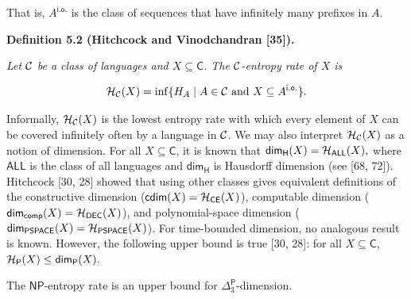 That is, $A^{\mathsf{i.o.}}$ is the class of sequences that have infinitely many
prefixes in $A$.\par





\par\medskip\noindent\textbf{
\textbf{Definition 5.2}\textbf{ }(Hitchcock and Vinodchandran [35])\textbf{.}
}\par



\emph{Let ${\cal C}$ be a class of languages and $X\subseteq\mathsf{C}$. The ${\cal C}$-entropy rate of $X$ is}\par


\[\begin{gathered}
{\cal H}_{\cal C}(X)=\inf\{H_{A}\mid A\in{\cal C}\textrm{ and }X\subseteq A^{\mathsf{i.o.}}\}.
\end{gathered}\]






Informally, ${\cal H}_{\cal C}(X)$ is the lowest entropy rate with which every
element of $X$ can be covered infinitely often by a language in
${\cal C}$.
We may also interpret ${\cal H}_{\cal C}(X)$ as a notion of dimension.
For all $X\subseteq\mathsf{C}$, it is known that
${\mathsf{dim}}_{\mathsf{H}}(X)={\cal H}_{\mathsf{ALL}}(X),$ where $\mathsf{ALL}$ is the class of all
languages and ${\mathsf{dim}}_{\mathsf{H}}$ is Hausdorff dimension (see [68, 72]). Hitchcock [30, 28] showed that using other
classes gives equivalent definitions of the constructive dimension ($\mathsf{cdim}(X)={\cal H}_{\mathsf{CE}}(X)$), computable dimension (${\mathsf{dim}}_{\mathsf{comp}}(X)={\cal H}_{\mathsf{DEC}}(X)$), and polynomial-space dimension (${\mathsf{dim}}_{\mathsf{PSPACE}}(X)={\cal H}_{\mathsf{PSPACE}}(X)$).
For time-bounded dimension, no analogous result is known.
However, the following upper bound is true [30, 28]:
for all $X\subseteq\mathsf{C}$, ${\cal H}_{\mathsf{P}}(X)\leq{\mathsf{dim}}_{\mathsf{P}}(X).$\par




The $\mathsf{NP}$-entropy rate is an upper bound for
${\Delta^{\mathsf{P}}_{3}}$-dimension.\par





